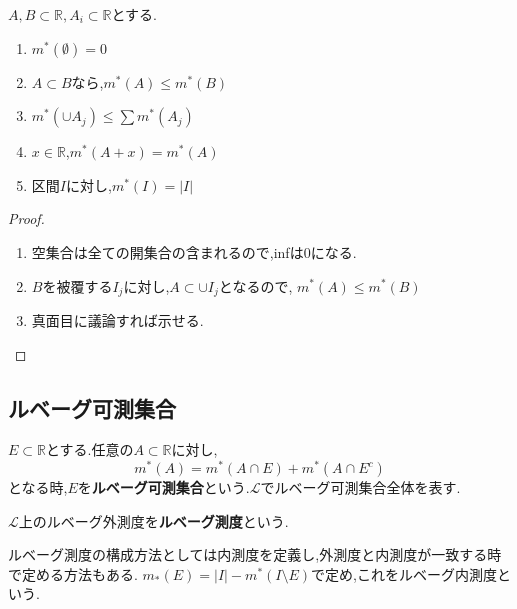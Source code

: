 \begin{thm}
  $A, B \subset \mathbb{R}, A_i \subset \mathbb{R}$とする.
  \begin{enumerate}
    \item $m^*(\emptyset) = 0$
    \item $A \subset B$なら,$m^*(A) \le m^*(B)$
    \item $m^*(\cup A_j) \le \sum m^*(A_j)$
    \item $x \in \mathbb{R}$,$m^*(A+x) = m^*(A)$
    \item 区間$I$に対し,$m^*(I) = |I|$
  \end{enumerate}
\end{thm}
\begin{proof}
  \begin{enumerate}
    \item 空集合は全ての開集合の含まれるので,infは0になる.
    \item $B$を被覆する$I_j$に対し,$A \subset \cup I_j$となるので,
    $m^*(A) \le m^*(B)$
    \item 真面目に議論すれば示せる.
  \end{enumerate}
\end{proof}


\subsection{ルベーグ可測集合}
\begin{screen}
\begin{dfn}
 $E \subset \mathbb{R}$とする.任意の$A \subset \mathbb{R}$に対し,
 \begin{equation*}
 m^*(A) = m^*(A \cap E) + m^*(A \cap E^c)
 \end{equation*}
 となる時,$E$を\textbf{ルベーグ可測集合}という.$\mathcal{L}$でルベーグ可測集合全体を表す.
\end{dfn}
\end{screen}


\begin{screen}
\begin{dfn}
 $\mathcal{L}$上のルベーグ外測度を\textbf{ルベーグ測度}という.
\end{dfn}
\end{screen}

\begin{rem}
  ルベーグ測度の構成方法としては内測度を定義し,外測度と内測度が一致する時で定める方法もある.
  $m_*(E) = |I| - m^*(I \setminus E)$で定め,これをルベーグ内測度という.
\end{rem}

